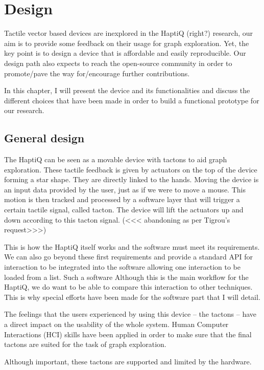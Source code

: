 \chapter{Design}

Tactile vector based devices are inexplored in the HaptiQ (right?) research, our aim is to provide some feedback on their usage for graph exploration. Yet, the key point is to design a device that is affordable and easily reproducible. Our design path also expects to reach the open-source community in order to promote/pave the way for/encourage further contributions.

In this chapter, I will present the device and its functionalities and discuss the different choices that have been made in order to build a functional prototype for our research.

\section{General design}\label{global-design}

The HaptiQ can be seen as a movable device with tactons to aid graph exploration. These tactile feedback is given by actuators on the top of the device forming a star shape. They are directly linked to the hands. Moving the device is an input data provided by the user, just as if we were to move a mouse. This motion is then tracked and processed by a
software layer that will trigger a certain tactile signal, called tacton. The device will lift the actuators up and down according to this tacton signal. (<<< abandoning as per Tigrou's request>>>)

This is how the HaptiQ itself works and the software must meet its
requirements. We can also go beyond these first requirements and provide
a standard API for interaction to be integrated into the software
allowing one interaction to be loaded from a list. Such a software
Although this is the main workflow for the HaptiQ, we do want to be able
to compare this interaction to other techniques. This is why special
efforts have been made for the software part that I will detail.

The feelings that the users experienced by using this device -- the
tactons -- have a direct impact on the usability of the whole system.
Human Computer Interactions (HCI) skills have been applied in order to
make sure that the final tactons are suited for the task of graph
exploration.

Although important, these tactons are supported and limited by the
hardware.

